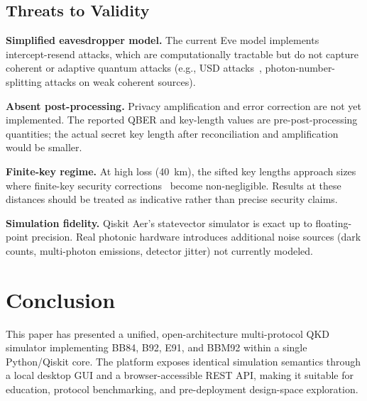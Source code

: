 \documentclass[journal]{IEEEtran}
\begin{document}
\subsection{Threats to Validity}

\textbf{Simplified eavesdropper model.}
The current Eve model implements intercept-resend attacks, which are
computationally tractable but do not capture coherent or adaptive
quantum attacks (e.g., USD attacks~\cite{ivanovic1987},
photon-number-splitting attacks on weak coherent sources).

\textbf{Absent post-processing.}
Privacy amplification and error correction are not yet implemented.
The reported QBER and key-length values are pre-post-processing
quantities; the actual secret key length after reconciliation and
amplification would be smaller.

\textbf{Finite-key regime.}
At high loss (40~km), the sifted key lengths approach sizes where
finite-key security corrections~\cite{tomamichel2012} become
non-negligible. Results at these distances should be treated as
indicative rather than precise security claims.

\textbf{Simulation fidelity.}
Qiskit Aer's statevector simulator is exact up to floating-point
precision. Real photonic hardware introduces additional noise sources
(dark counts, multi-photon emissions, detector jitter) not currently
modeled.

\section{Conclusion}
\label{sec:conclusion}

This paper has presented a unified, open-architecture multi-protocol
QKD simulator implementing BB84, B92, E91, and BBM92 within a single
Python/Qiskit core. The platform exposes identical simulation semantics
through a local desktop GUI and a browser-accessible REST API, making
it suitable for education, protocol benchmarking, and pre-deployment
design-space exploration.
\end{document}
